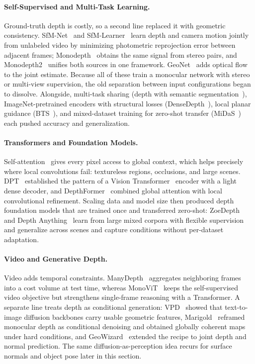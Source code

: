 \paragraph{Self-Supervised and Multi-Task Learning.}
Ground-truth depth is costly, so a second line replaced it with geometric consistency. SfM-Net~\cite{vijayanarasimhan2017sfm} and SfM-Learner~\cite{zhou2017unsupervised} learn depth and camera motion jointly from unlabeled video by minimizing photometric reprojection error between adjacent frames; Monodepth~\cite{godard2017unsupervised} obtains the same signal from stereo pairs, and Monodepth2~\cite{godard2019digging} unifies both sources in one framework. GeoNet~\cite{yin2018geonet} adds optical flow to the joint estimate. Because all of these train a monocular network with stereo or multi-view supervision, the old separation between input configurations began to dissolve. Alongside, multi-task sharing (depth with semantic segmentation~\cite{wang2015towards}), ImageNet-pretrained encoders with structural losses (DenseDepth~\cite{alhashim2018high,deng2009imagenet,huang2017densely}), local planar guidance (BTS~\cite{lee2019big}), and mixed-dataset training for zero-shot transfer (MiDaS~\cite{MiDaS}) each pushed accuracy and generalization.

\paragraph{Transformers and Foundation Models.}
Self-attention~\cite{attention} gives every pixel access to global context, which helps precisely where local convolutions fail: textureless regions, occlusions, and large scenes. DPT~\cite{dpt} established the pattern of a Vision Transformer~\cite{vit} encoder with a light dense decoder, and DepthFormer~\cite{li2023depthformer} combined global attention with local convolutional refinement. Scaling data and model size then produced depth foundation models that are trained once and transferred zero-shot: ZoeDepth~\cite{zoedepth} and Depth Anything~\cite{DepthAnything} learn from large mixed corpora with flexible supervision and generalize across scenes and capture conditions without per-dataset adaptation.

\paragraph{Video and Generative Depth.}
Video adds temporal constraints. ManyDepth~\cite{watson2021temporal} aggregates neighboring frames into a cost volume at test time, whereas MonoViT~\cite{zhao2022monovit} keeps the self-supervised video objective but strengthens single-frame reasoning with a Transformer. A separate line treats depth as conditional generation: VPD~\cite{zhao2023unleashing} showed that text-to-image diffusion backbones carry usable geometric features, Marigold~\cite{ke2024repurposing} reframed monocular depth as conditional denoising and obtained globally coherent maps under hard conditions, and GeoWizard~\cite{fu2024geowizard} extended the recipe to joint depth and normal prediction. The same diffusion-as-perception idea recurs for surface normals and object pose later in this section.

